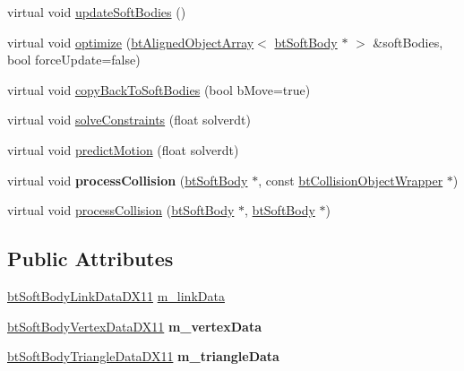 \begin{DoxyCompactItemize}
\item 
virtual void \hyperlink{classbtDX11SoftBodySolver_a2b96a99eb97d2ae1fc9235bba8cb70ce}{update\+Soft\+Bodies} ()
\item 
virtual void \hyperlink{classbtDX11SoftBodySolver_a59eaf00da6dcf9c6fc25bdb4cff2718a}{optimize} (\hyperlink{classbtAlignedObjectArray}{bt\+Aligned\+Object\+Array}$<$ \hyperlink{classbtSoftBody}{bt\+Soft\+Body} $\ast$ $>$ \&soft\+Bodies, bool force\+Update=false)
\item 
virtual void \hyperlink{classbtDX11SoftBodySolver_aa0f25b116d336dabb716c8cd08f940b7}{copy\+Back\+To\+Soft\+Bodies} (bool b\+Move=true)
\item 
virtual void \hyperlink{classbtDX11SoftBodySolver_a4394232848404499b2a77fdf10336496}{solve\+Constraints} (float solverdt)
\item 
virtual void \hyperlink{classbtDX11SoftBodySolver_a408e312da4af3721c9f3e0a5e2c2473d}{predict\+Motion} (float solverdt)
\item 
\mbox{\label{classbtDX11SoftBodySolver_a684a589055f2870e25d8d21cf5529eba}} 
virtual void {\bfseries process\+Collision} (\hyperlink{classbtSoftBody}{bt\+Soft\+Body} $\ast$, const \hyperlink{structbtCollisionObjectWrapper}{bt\+Collision\+Object\+Wrapper} $\ast$)
\item 
virtual void \hyperlink{classbtDX11SoftBodySolver_af49d469304c58ed901182915915aee64}{process\+Collision} (\hyperlink{classbtSoftBody}{bt\+Soft\+Body} $\ast$, \hyperlink{classbtSoftBody}{bt\+Soft\+Body} $\ast$)
\end{DoxyCompactItemize}
\subsection*{Public Attributes}
\begin{DoxyCompactItemize}
\item 
\hyperlink{classbtSoftBodyLinkDataDX11}{bt\+Soft\+Body\+Link\+Data\+D\+X11} \hyperlink{classbtDX11SoftBodySolver_a0477894bad3bbed9dcfd7922baeb782d}{m\+\_\+link\+Data}
\item 
\mbox{\label{classbtDX11SoftBodySolver_a4e6bf3c6c038adf0c812e905edbf985a}} 
\hyperlink{classbtSoftBodyVertexDataDX11}{bt\+Soft\+Body\+Vertex\+Data\+D\+X11} {\bfseries m\+\_\+vertex\+Data}
\item 
\mbox{\label{classbtDX11SoftBodySolver_a4372069aa895c45f25f8ec330be81ab2}} 
\hyperlink{classbtSoftBodyTriangleDataDX11}{bt\+Soft\+Body\+Triangle\+Data\+D\+X11} {\bfseries m\+\_\+triangle\+Data}
\end{DoxyCompactItemize}
